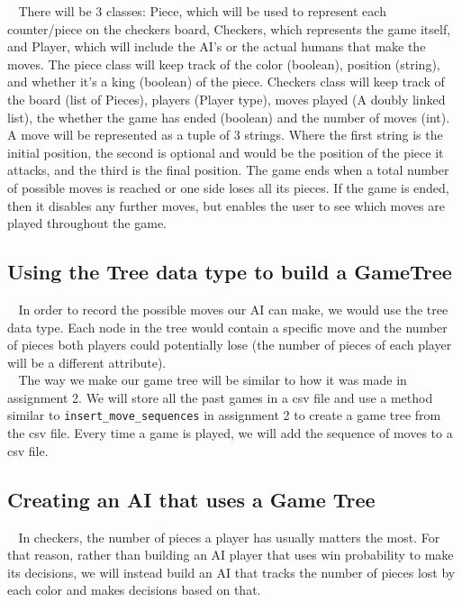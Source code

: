 \documentclass[fontsize=11pt]{article}
\begin{document}
$~~~~$There will be 3 classes: Piece, which will be used to represent each counter/piece on the checkers board, Checkers, which represents the game itself, and Player, which will include the AI’s or the actual humans that make the moves. The piece class will keep track of the color (boolean), position (string), and whether it's a king (boolean) of the piece. Checkers class will keep track of the board (list of Pieces), players (Player type), moves played (A doubly linked list), the whether the game has ended (boolean) and the number of moves (int). A move will be represented as a tuple of 3 strings. Where the first string is the initial position, the second is optional and would be the position of the piece it attacks, and the third is the final position. The game ends when a total number of possible moves is reached or one side loses all its pieces. If the game is ended, then it disables any further moves, but enables the user to see which moves are played throughout the game.


\subsection*{Using the Tree data type to build a GameTree}

$~~~~$In order to record the possible moves our AI can make, we would use the tree data type. Each node in the tree would contain a specific move and the number of pieces both players could potentially lose (the number of pieces of each player will be a different attribute).\\

$~~~~$The way we make our game tree will be similar to how it was made in assignment 2. We will store all the past games in a csv file and use a method similar to \texttt{insert\_move\_sequences} in assignment 2 to create a game tree from the csv file. Every time a game is played, we will add the sequence of moves to a csv file. 

\subsection*{Creating an AI that uses a Game Tree}

$~~~~$In checkers, the number of pieces a player has usually matters the most. For that reason, rather than building an AI player that uses win probability to make its decisions, we will instead build an AI that tracks the number of pieces lost by each color and makes decisions based on that. \\
\end{document}
